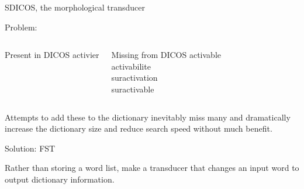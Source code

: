 \documentclass[10pt]{beamer}
\begin{document}
\begin{frame}[fragile]{SDICOS, the morphological transducer}

  Problem:

  \begin{columns}[T,onlytextwidth]


      \begin{block}{Present in DICOS}
        activier
      \end{block}




      \begin{block}{Missing from DICOS}
        activable \\
        activabilite \\
        suractivation \\
        suractivable \\

      \end{block}

  \end{columns}



  Attempts to add these to the dictionary inevitably miss many and dramatically increase the dictionary size and reduce search speed without much benefit. 






\end{frame}

\begin{frame}[fragile]{Solution: FST}
  
  Rather than storing a word list, make a transducer that changes an input word to output dictionary information. 


\end{frame}
\end{document}
